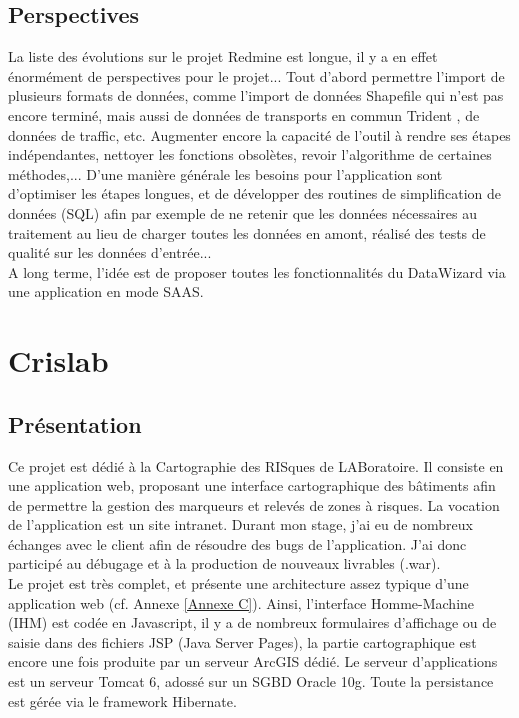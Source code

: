 \begin{itemize}
\subsection{Perspectives}

La liste des évolutions sur le projet Redmine est longue, il y a en effet énormément de perspectives pour le projet... Tout d'abord permettre l'import de plusieurs formats de données, comme l'import de données \og Shapefile \fg qui n'est pas encore terminé, mais aussi de données de transports en commun \og Trident \fg, de données de traffic, etc. 
Augmenter encore la capacité de l'outil à rendre ses étapes indépendantes, nettoyer les fonctions obsolètes, revoir l'algorithme de certaines méthodes,...
D'une manière générale les besoins pour l'application sont d'optimiser les étapes longues, et de développer des routines de simplification de données (SQL) afin par exemple de ne retenir que les données nécessaires au traitement au lieu de charger toutes les données en amont, réalisé des tests de qualité sur les données d'entrée... \\

A long terme, l'idée est de proposer toutes les fonctionnalités du DataWizard via une application en mode SAAS.\\


\section{Crislab}\label{Divers}

\subsection{Présentation} 

Ce projet est dédié à la Cartographie des RISques de LABoratoire. Il consiste en une application web, proposant une interface cartographique des bâtiments afin de permettre la gestion des marqueurs et relevés de zones à risques. La vocation de l'application est un site intranet. Durant mon stage, j'ai eu de nombreux échanges avec le client afin de résoudre des bugs de l'application. J'ai donc participé au débugage et à la production de nouveaux livrables (.war).\\

Le projet est très complet, et présente une architecture assez typique d'une application web (cf. Annexe \ref{Annexe C}). Ainsi, l'interface Homme-Machine (IHM) est codée en Javascript, il y a de nombreux formulaires d'affichage ou de saisie dans des fichiers JSP  (Java Server Pages), la partie cartographique est encore une fois produite par un serveur ArcGIS dédié. Le serveur d'applications est un serveur Tomcat 6, adossé sur un SGBD Oracle 10g. Toute la persistance est gérée via le framework Hibernate.\\


\end{itemize}
